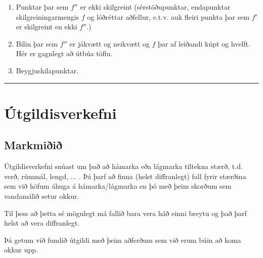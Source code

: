 \documentclass[a4paper,10pt,icelandic]{sphinxmanual}
\begin{document}
\begin{enumerate}
\begin{description}
\begin{enumerate}
\item {} 
Punktar þar sem \(f''\) er ekki skilgreint (sérstöðupunktar, endapunktar skilgreiningarmengis \(f\) og lóðréttar aðfellur, e.t.v. auk fleiri punkta þar sem \(f'\) er skilgreint en ekki \(f''\).)

\item {} 
Bilin þar sem \(f''\) er jákvætt og neikvætt og \(f\) þar af leiðandi kúpt og hvelft. Hér er gagnlegt að útbúa töflu.

\item {} 
Beygjuskilapunktar.

\end{enumerate}

\end{description}

\end{enumerate}


\bigskip\hrule{}\bigskip

\newpage
{}

\section{Útgildisverkefni}
\label{kafli05:utgildisverkefni}\label{kafli05:index-5}

\subsection{Markmiðið}
\label{kafli05:markmii}
Útgildisverkefni snúast um það að hámarka eða lágmarka tiltekna stærð, t.d.
verð, rúmmál, lengd, ... . Þá þarf að finna (helst diffranlegt) fall fyrir stærðina
sem við höfum áhuga á hámarka/lágmarka en þó með þeim skorðum sem vandamálið setur okkur.

Til þess að þetta sé mögulegt má fallið bara vera háð einni breytu og
það þarf helst að vera diffranlegt.

Þá getum við fundið útgildi með þeim aðferðum sem við erum búin að koma
okkur upp.
\end{document}
